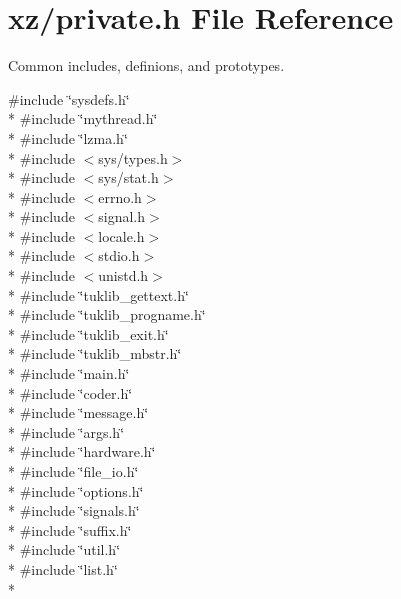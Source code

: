 \section{xz/private.h File Reference}
\label{private_8h}


Common includes, definions, and prototypes.  


{\ttfamily \#include \char`\"{}sysdefs.\-h\char`\"{}}\\*
{\ttfamily \#include \char`\"{}mythread.\-h\char`\"{}}\\*
{\ttfamily \#include \char`\"{}lzma.\-h\char`\"{}}\\*
{\ttfamily \#include $<$sys/types.\-h$>$}\\*
{\ttfamily \#include $<$sys/stat.\-h$>$}\\*
{\ttfamily \#include $<$errno.\-h$>$}\\*
{\ttfamily \#include $<$signal.\-h$>$}\\*
{\ttfamily \#include $<$locale.\-h$>$}\\*
{\ttfamily \#include $<$stdio.\-h$>$}\\*
{\ttfamily \#include $<$unistd.\-h$>$}\\*
{\ttfamily \#include \char`\"{}tuklib\-\_\-gettext.\-h\char`\"{}}\\*
{\ttfamily \#include \char`\"{}tuklib\-\_\-progname.\-h\char`\"{}}\\*
{\ttfamily \#include \char`\"{}tuklib\-\_\-exit.\-h\char`\"{}}\\*
{\ttfamily \#include \char`\"{}tuklib\-\_\-mbstr.\-h\char`\"{}}\\*
{\ttfamily \#include \char`\"{}main.\-h\char`\"{}}\\*
{\ttfamily \#include \char`\"{}coder.\-h\char`\"{}}\\*
{\ttfamily \#include \char`\"{}message.\-h\char`\"{}}\\*
{\ttfamily \#include \char`\"{}args.\-h\char`\"{}}\\*
{\ttfamily \#include \char`\"{}hardware.\-h\char`\"{}}\\*
{\ttfamily \#include \char`\"{}file\-\_\-io.\-h\char`\"{}}\\*
{\ttfamily \#include \char`\"{}options.\-h\char`\"{}}\\*
{\ttfamily \#include \char`\"{}signals.\-h\char`\"{}}\\*
{\ttfamily \#include \char`\"{}suffix.\-h\char`\"{}}\\*
{\ttfamily \#include \char`\"{}util.\-h\char`\"{}}\\*
{\ttfamily \#include \char`\"{}list.\-h\char`\"{}}\\*
